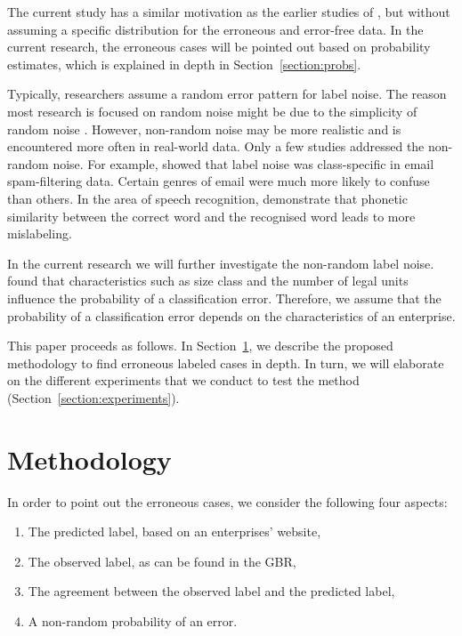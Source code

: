 \documentclass[12pt, a4paper, titlepage]{article}
\begin{document}
The current study has a similar motivation as the earlier studies of \citet{DiZio, Eskin}, but without assuming a specific distribution for the erroneous and error-free data. In the current research, the erroneous cases will be pointed out based on probability estimates, which is explained in depth in Section~\ref{section:probs}.

Typically, researchers assume a random error pattern for label noise. The reason most research is focused on random noise might be due to the simplicity of random noise \citep{bootkrajang2}. However, non-random noise may be more realistic and is encountered more often in real-world data. Only a few studies addressed the non-random noise. For example, \citet{kolcz} showed that label noise was class-specific in email spam-filtering data. Certain genres of email were much more likely to confuse than others. In the area of speech recognition, \citet{speech} demonstrate that phonetic similarity between the correct word and the recognised word leads to more mislabeling. 

In the current research we will further investigate the non-random label noise. \citet{DeldenScholtusBurger} found that characteristics such as size class and the number of legal units influence the probability of a classification error. Therefore, we assume that the probability of a classification error depends on the characteristics of an enterprise. 

\bigskip

This paper proceeds as follows. In Section~\ref{section:method}, we describe the proposed methodology to find erroneous labeled cases in depth. In turn, we will elaborate on the different experiments that we conduct to test the method (Section~\ref{section:experiments}). 


							\section{Methodology}
							\label{section:method}

In order to point out the erroneous cases, we consider the following four aspects:
\begin{enumerate}
\item The predicted label, based on an enterprises' website,
\item The observed label, as can be found in the GBR,
\item The agreement between the observed label and the predicted label,
\item A non-random probability of an error.
\end{enumerate}
\end{document}
